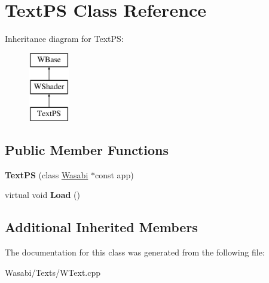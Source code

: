 \hypertarget{class_text_p_s}{}\section{Text\+PS Class Reference}
\label{class_text_p_s}
Inheritance diagram for Text\+PS\+:\begin{figure}[H]
\begin{center}
\leavevmode
\includegraphics[height=3.000000cm]{class_text_p_s}
\end{center}
\end{figure}
\subsection*{Public Member Functions}
\begin{DoxyCompactItemize}
\item 
{\bfseries Text\+PS} (class \hyperlink{class_wasabi}{Wasabi} $\ast$const app)\hypertarget{class_text_p_s_a1d6339b4c0074363f17726ab72e84c91}{}\label{class_text_p_s_a1d6339b4c0074363f17726ab72e84c91}

\item 
virtual void {\bfseries Load} ()\hypertarget{class_text_p_s_af22b914fbd382746541d1cf04cf6a80f}{}\label{class_text_p_s_af22b914fbd382746541d1cf04cf6a80f}

\end{DoxyCompactItemize}
\subsection*{Additional Inherited Members}


The documentation for this class was generated from the following file\+:\begin{DoxyCompactItemize}
\item 
Wasabi/\+Texts/W\+Text.\+cpp\end{DoxyCompactItemize}
